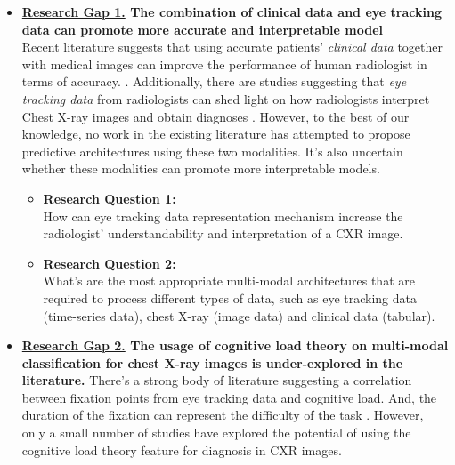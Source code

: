 \begin{itemize}
    \item \textbf{\underline{Research Gap 1.} The combination of clinical data and eye tracking data can promote more accurate and interpretable model} \\ Recent literature suggests that using accurate patients' \textit{clinical data} together with medical images can improve the performance of human radiologist in terms of accuracy. \citep{Castillo2020ClinicalInformationOnRadiology, Leslie2000CTClinicalData}. Additionally, there are studies suggesting that \textit{eye tracking data} from radiologists can shed light on how radiologists interpret Chest X-ray images and obtain diagnoses \citep{Karargyris2021EyeGazePaper, Lanfredi2021REFLACX}. However, to the best of our knowledge, no work in the existing literature has attempted to propose predictive architectures using these two modalities. It's also uncertain whether these modalities can promote more interpretable models.
          \begin{itemize}
              \item \textbf{Research Question 1:} \\ How can eye tracking data representation mechanism increase the radiologist' understandability and interpretation of a CXR image.
              \item \textbf{Research Question 2:} \\  What's are the most appropriate multi-modal architectures that are required to process different types of data, such as eye tracking data (time-series data), chest X-ray (image data) and clinical data (tabular).
          \end{itemize}
    \item  \textbf{\underline{Research Gap 2.} The usage of cognitive load theory on multi-modal classification for chest X-ray images is under-explored in the literature.} There's a strong body of literature suggesting a correlation between fixation points from eye tracking data and cognitive load. And, the duration of the fixation can represent the difficulty of the task \citep{Palinko2010EyeTrackingCognitiveLoad-1, Zagermann2016EyeTrackingCognitiveLoad-2, Wang2014EyeTrackingCognitiveLoad-3, Krejtz2018EyeTrackingCognitiveLoad-4,Klingner2010EyeTrackingCognitiveLoad-5}. However, only a small number of studies have explored the potential of using the cognitive load theory feature for diagnosis in CXR images.

\end{itemize}
